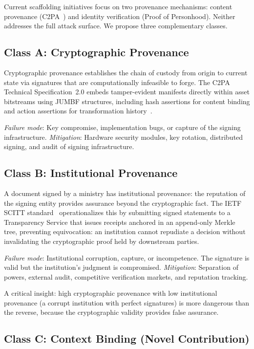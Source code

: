 \documentclass[runningheads]{llncs}
\begin{document}
Current scaffolding initiatives focus on two provenance mechanisms: content provenance (C2PA~\cite{c2pa2024}) and identity verification (Proof of Personhood). Neither addresses the full attack surface. We propose three complementary classes.

\subsection{Class A: Cryptographic Provenance}

Cryptographic provenance establishes the chain of custody from origin to current state via signatures that are computationally infeasible to forge. The C2PA Technical Specification~2.0 embeds tamper-evident manifests directly within asset bitstreams using JUMBF structures, including hash assertions for content binding and action assertions for transformation history~\cite{c2pa2024}.

\emph{Failure mode}: Key compromise, implementation bugs, or capture of the signing infrastructure. \emph{Mitigation}: Hardware security modules, key rotation, distributed signing, and audit of signing infrastructure.

\subsection{Class B: Institutional Provenance}

A document signed by a ministry has institutional provenance: the reputation of the signing entity provides assurance beyond the cryptographic fact. The IETF SCITT standard~\cite{birkholz2025scitt} operationalizes this by submitting signed statements to a Transparency Service that issues receipts anchored in an append-only Merkle tree, preventing equivocation: an institution cannot repudiate a decision without invalidating the cryptographic proof held by downstream parties.

\emph{Failure mode}: Institutional corruption, capture, or incompetence. The signature is valid but the institution's judgment is compromised. \emph{Mitigation}: Separation of powers, external audit, competitive verification markets, and reputation tracking.

A critical insight: high cryptographic provenance with low institutional provenance (a corrupt institution with perfect signatures) is more dangerous than the reverse, because the cryptographic validity provides false assurance.

\subsection{Class C: Context Binding (Novel Contribution)}
\label{sec:contextbinding}
\end{document}

